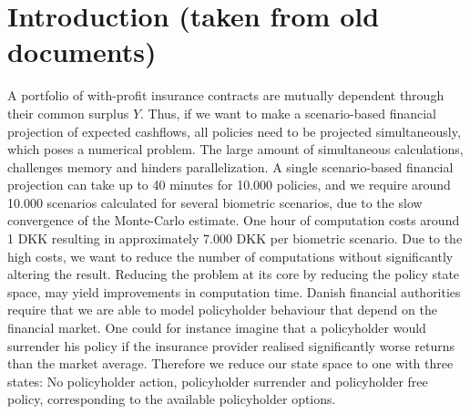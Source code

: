 \documentclass[12pt]{article}
\theoremstyle{my_thm}
\theoremstyle{my_def}
\theoremstyle{my_thm2}
\begin{document}
\section*{Introduction (taken from old documents)}
A portfolio of with-profit insurance contracts are mutually dependent through their common surplus $Y$. Thus, if we want to make a scenario-based financial projection of expected cashflows, all policies need to be projected simultaneously, which poses a numerical problem. The large amount of simultaneous calculations, challenges memory and hinders parallelization. A single scenario-based financial projection can take up to 40 minutes for 10.000 policies, and we require around 10.000 scenarios calculated for several biometric scenarios, due to the slow convergence of the Monte-Carlo estimate. One hour of computation costs around 1 DKK resulting in approximately 7.000 DKK per biometric scenario. Due to the high costs, we want to reduce the number of computations without significantly altering the result. Reducing the problem at its core by reducing the policy state space, may yield improvements in computation time. Danish financial authorities require that we are able to model policyholder behaviour that depend on the financial market. One could for instance imagine that a policyholder would surrender his policy if the insurance provider realised significantly worse returns than the market average. Therefore we reduce our state space to one with three states: No policyholder action, policyholder surrender and policyholder free policy, corresponding to the available policyholder options.
\end{document}
